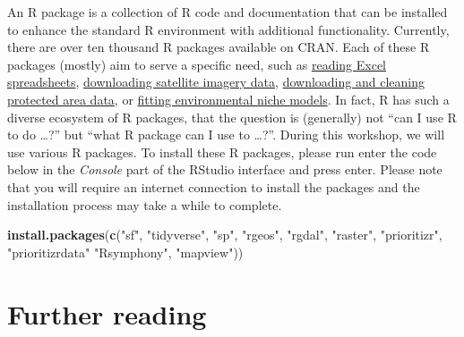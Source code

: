 \documentclass[]{book}
\newenvironment{Shaded}{\begin{snugshade}}{\end{snugshade}}
\newcommand{\KeywordTok}[1]{\textcolor[rgb]{0.13,0.29,0.53}{\textbf{#1}}}
\newcommand{\StringTok}[1]{\textcolor[rgb]{0.31,0.60,0.02}{#1}}
\newcommand{\NormalTok}[1]{#1}
\begin{document}
An R package is a collection of R code and documentation that can be
installed to enhance the standard R environment with additional
functionality. Currently, there are over ten thousand R packages
available on CRAN. Each of these R packages (mostly) aim to serve a
specific need, such as
\href{https://cran.r-project.org/web/packages/readxl/index.html}{reading
Excel spreadsheets},
\href{https://cran.r-project.org/web/packages/MODIStsp/index.html}{downloading
satellite imagery data},
\href{https://cran.r-project.org/web/packages/wdpar/index.html}{downloading
and cleaning protected area data}, or
\href{https://cran.r-project.org/web/packages/ENMeval/index.html}{fitting
environmental niche models}. In fact, R has such a diverse ecosystem of
R packages, that the question is (generally) not ``can I use R to do
\ldots{}?'' but ``what R package can I use to \ldots{}?''. During this
workshop, we will use various R packages. To install these R packages,
please run enter the code below in the \emph{Console} part of the
RStudio interface and press enter. Please note that you will require an
internet connection to install the packages and the installation process
may take a while to complete.

\begin{Shaded}
\begin{Highlighting}[]
\KeywordTok{install.packages}\NormalTok{(}\KeywordTok{c}\NormalTok{(}\StringTok{"sf"}\NormalTok{, }\StringTok{"tidyverse"}\NormalTok{, }\StringTok{"sp"}\NormalTok{, }\StringTok{"rgeos"}\NormalTok{, }\StringTok{"rgdal"}\NormalTok{, }\StringTok{"raster"}\NormalTok{,}
                   \StringTok{"prioritizr"}\NormalTok{, }\StringTok{"prioritizrdata"} \StringTok{"Rsymphony"}\NormalTok{, }\StringTok{"mapview"}\NormalTok{))}
\end{Highlighting}
\end{Shaded}

\section{Further reading}\label{further-reading}
\end{document}
